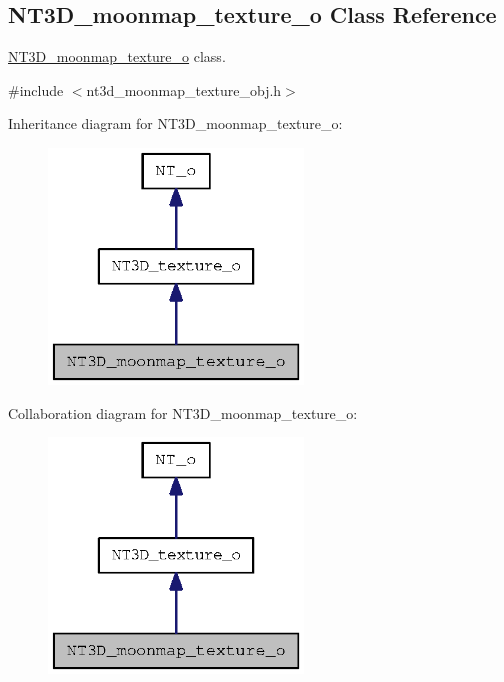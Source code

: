 \subsection{NT3D\_\-moonmap\_\-texture\_\-o Class Reference}
\label{class_n_t3_d__moonmap__texture__o}


\hyperlink{class_n_t3_d__moonmap__texture__o}{NT3D\_\-moonmap\_\-texture\_\-o} class.  




{\ttfamily \#include $<$nt3d\_\-moonmap\_\-texture\_\-obj.h$>$}



Inheritance diagram for NT3D\_\-moonmap\_\-texture\_\-o:
\nopagebreak
\begin{figure}[H]
\begin{center}
\leavevmode
\includegraphics[width=192pt]{class_n_t3_d__moonmap__texture__o__inherit__graph}
\end{center}
\end{figure}


Collaboration diagram for NT3D\_\-moonmap\_\-texture\_\-o:
\nopagebreak
\begin{figure}[H]
\begin{center}
\leavevmode
\includegraphics[width=192pt]{class_n_t3_d__moonmap__texture__o__coll__graph}
\end{center}
\end{figure}
